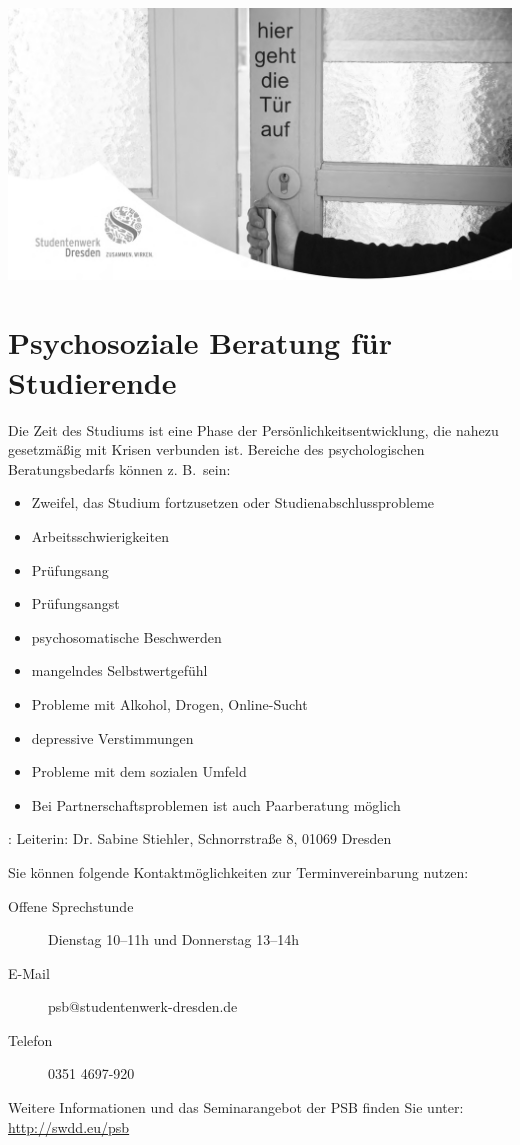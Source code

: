 \includegraphics[width=\textwidth]{./psychoberatung-titlepicture-gray.png}

\section*{Psychosoziale Beratung für Studierende}
\label{sec:psychosoziale_beratung_fur_studierende}
Die Zeit des Studiums ist eine Phase der Persönlichkeitsentwicklung, die nahezu 
gesetzmäßig mit Krisen verbunden ist. Bereiche des psychologischen Beratungsbedarfs können z. B.\ sein:
\begin{itemize}
  \item  Zweifel, das Studium fortzusetzen oder Studienabschlussprobleme
  \item Arbeitsschwierigkeiten 
\item Prüfungsang
   \item      Prüfungsangst
  \item    psychosomatische Beschwerden
\item  mangelndes Selbstwertgefühl
\item Probleme mit Alkohol, Drogen, Online-Sucht
\item    depressive Verstimmungen
\item   Probleme mit dem sozialen Umfeld
\item   Bei Partnerschaftsproblemen ist auch Paarberatung möglich
\end{itemize}
:
\label{sub:psychosoziale_beratungsstelle_psb_}
Leiterin: Dr. Sabine Stiehler, 
Schnorrstraße 8, 01069 Dresden

Sie können folgende Kontaktmöglichkeiten zur Terminvereinbarung nutzen:
\begin{description}
  \item[Offene Sprechstunde] Dienstag 10--11h und Donnerstag 13--14h
  \item [E-Mail] psb@studentenwerk-dresden.de
  \item [Telefon] 0351 4697-920    
\end{description}
Weitere Informationen und das Seminarangebot der PSB finden Sie unter: \url{http://swdd.eu/psb}

